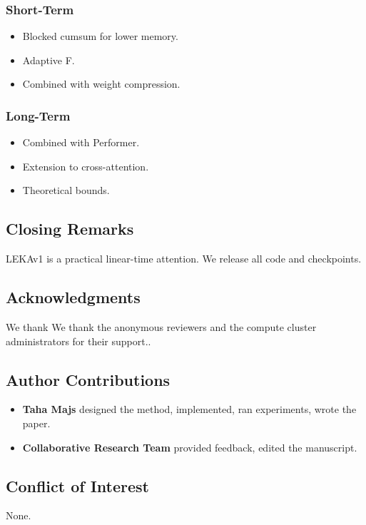 \subsubsection{Short-Term}
\begin{itemize}
\item Blocked cumsum for lower memory.
\item Adaptive F.
\item Combined with weight compression.

\end{itemize}
\subsubsection{Long-Term}
\begin{itemize}
\item Combined with Performer.
\item Extension to cross-attention.
\item Theoretical bounds.

\end{itemize}
\subsection{Closing Remarks}

LEKAv1 is a practical linear-time attention. We release all code and 
checkpoints.

\subsection{Acknowledgments}

We thank We thank the anonymous reviewers and the compute cluster administrators for their support..

\subsection{Author Contributions}

\begin{itemize}
\item \textbf{Taha Majs} designed the method, implemented, ran experiments,
  wrote the paper.
\item \textbf{Collaborative Research Team} provided feedback, edited the manuscript.

\end{itemize}
\subsection{Conflict of Interest}

None.

